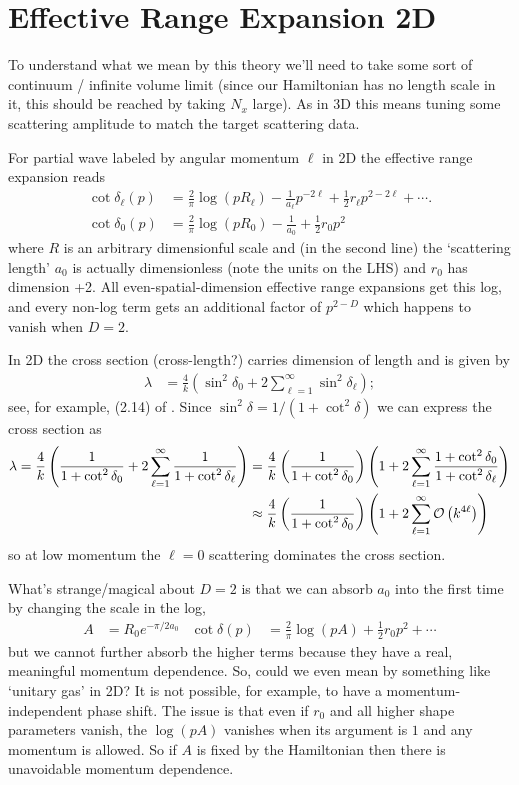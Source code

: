 \section{Effective Range Expansion 2D}

To understand what we mean by this theory we'll need to take some sort of continuum / infinite volume limit (since our Hamiltonian has no length scale in it, this should be reached by taking $N_x$ large).
As in 3D this means tuning some scattering amplitude to match the target scattering data.

For partial wave labeled by angular momentum $\ell$ in 2D the effective range expansion reads
\begin{align}
	\cot \delta_\ell(p)
	&=
			\frac{2}{\pi} \log(p R_\ell)
		-	\frac{1}{a_\ell} p^{-2\ell}
		+	\frac{1}{2} r_\ell p^{2-2\ell}
		+	\cdots.
	\\
	\cot \delta_0(p)
	&=
			\frac{2}{\pi} \log(p R_0)
		-	\frac{1}{a_0}
		+	\frac{1}{2} r_0 p^2
\end{align}
where $R$ is an arbitrary dimensionful scale and (in the second line) the `scattering length' $a_0$ is actually dimensionless (note the units on the LHS) and $r_0$ has dimension +2.
All even-spatial-dimension effective range expansions get this log, and every non-log term gets an additional factor of $p^{2-D}$ which happens to vanish when $D=2$.

In 2D the cross section (cross-length?) carries dimension of length and is given by
\begin{align}
	\lambda &= \frac{4}{k}\left(\sin^2 \delta_0 + 2\sum_{\ell=1}^{\infty} \sin^2 \delta_\ell \right);
\end{align}
see, for example, (2.14) of .
Since $\sin^2 \delta = 1/(1+\cot^2\delta)$ we can express the cross section as
\begin{align}
	\lambda
	=
	\frac{4}{k}\left(\frac{1}{1+\cot^2 \delta_0} + 2\sum_{\ell=1}^{\infty} \frac{1}{1+\cot^2 \delta_\ell} \right)
	&=
	\frac{4}{k}\left(\frac{1}{1+\cot^2 \delta_0}\right) \left(1+ 2\sum_{\ell=1}^{\infty} \frac{1+\cot^2 \delta_0}{1+\cot^2 \delta_\ell} \right)
	\\
	&\approx
	\frac{4}{k}\left(\frac{1}{1+\cot^2 \delta_0}\right) \left(1+ 2\sum_{\ell=1}^{\infty} \mathcal{O}\left(k^{4\ell}\right) \right)
\end{align}
so at low momentum the $\ell=0$ scattering dominates the cross section.

What's strange/magical about $D=2$ is that we can absorb $a_0$ into the first time by changing the scale in the log,
\begin{align}
	A &= R_0 e^{-\pi/2a_0}
	&
	\cot \delta(p)
	&=
			\frac{2}{\pi} \log(p A)
		+	\frac{1}{2} r_0 p^2
		+	\cdots
	\label{eq:no-constant}
\end{align}
but we cannot further absorb the higher terms because they have a real, meaningful momentum dependence.
So, could we even mean by something like `unitary gas' in 2D?
It is not possible, for example, to have a momentum-independent phase shift.
The issue is that even if $r_0$ and all higher shape parameters vanish, the $\log(pA)$ vanishes when its argument is $1$ and any momentum is allowed.
So if $A$ is fixed by the Hamiltonian then there is unavoidable momentum dependence.

